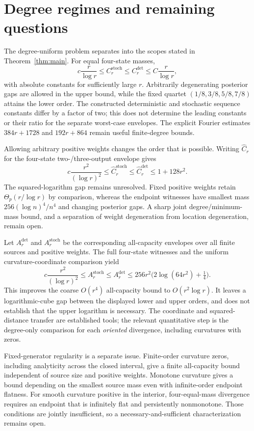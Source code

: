 \documentclass[11pt]{article}
\theoremstyle{definition}\newtheorem{definition}[theorem]{Definition}
\theoremstyle{remark}\newtheorem{remark}[theorem]{Remark}
\newcommand{\detp}{\mathrm{det}}
\newcommand{\stp}{\mathrm{stoch}}
\begin{document}



\section{Degree regimes and remaining questions}
\label{sec:conclusion}
The degree-uniform problem separates into the scopes stated in Theorem~\ref{thm:main}. For equal four-state masses,
\begin{equation}
c\frac{r}{\log r}\le C_r^{\stp}\le C_r^{\detp}
\le C\frac{r}{\log r},
\label{eq:mainbounds}
\end{equation}
with absolute constants for sufficiently large $r$. Arbitrarily degenerating posterior gaps are allowed in the upper bound, while the fixed quartet $(1/8,3/8,5/8,7/8)$ attains the lower order. The constructed deterministic and stochastic sequence constants differ by a factor of two; this does not determine the leading constants or their ratio for the separate worst-case envelopes. The explicit Fourier estimates $384r+1728$ and $192r+864$ remain useful finite-degree bounds.

Allowing arbitrary positive weights changes the order that is possible. Writing $\widehat C_r$ for the four-state two-/three-output envelope gives
\[
c\frac{r^2}{(\log r)^2}\le\widehat C_r^{\stp}
\le\widehat C_r^{\detp}\le1+128r^2.
\]
The squared-logarithm gap remains unresolved. Fixed positive weights retain $\Theta_p(r/\log r)$ by comparison, whereas the endpoint witnesses have smallest mass $256(\log n)^4/n^4$ and changing posterior gaps. A sharp joint degree/minimum-mass bound, and a separation of weight degeneration from location degeneration, remain open.

Let $A_r^{\detp}$ and $A_r^{\stp}$ be the corresponding all-capacity envelopes over all finite sources and positive weights. The full four-state witnesses and the uniform curvature-coordinate comparison yield
\[
c\frac{r^2}{(\log r)^2}\le A_r^{\stp}\le A_r^{\detp}
\le256r^2\bigl(2\log(64r^2)+\tfrac14\bigr).
\]
This improves the coarse $O(r^4)$ all-capacity bound to $O(r^2\log r)$. It leaves a logarithmic-cube gap between the displayed lower and upper orders, and does not establish that the upper logarithm is necessary. The coordinate and squared-distance transfer are established tools; the relevant quantitative step is the degree-only comparison for each \emph{oriented} divergence, including curvatures with zeros.

Fixed-generator regularity is a separate issue. Finite-order curvature zeros, including analyticity across the closed interval, give a finite all-capacity bound independent of source size and positive weights. Monotone curvature gives a bound depending on the smallest source mass even with infinite-order endpoint flatness. For smooth curvature positive in the interior, four-equal-mass divergence requires an endpoint that is infinitely flat and persistently nonmonotone. Those conditions are jointly insufficient, so a necessary-and-sufficient characterization remains open.
\end{document}
